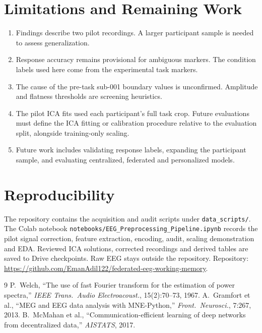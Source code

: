 \documentclass[11pt,a4paper]{article}
\begin{document}
\section{Limitations and Remaining Work}
\begin{enumerate}[leftmargin=*]
  \item Findings describe two pilot recordings. A larger participant sample
  is needed to assess generalization.
  \item Response accuracy remains provisional for ambiguous markers. The
  condition labels used here come from the experimental task markers.
  \item The cause of the pre-task sub-001 boundary values is unconfirmed.
  Amplitude and flatness thresholds are screening heuristics.
  \item The pilot ICA fits used each participant's full task crop. Future
  evaluations must define the ICA fitting or calibration procedure relative
  to the evaluation split, alongside training-only scaling.
  \item Future work includes validating response labels, expanding the
  participant sample, and evaluating centralized, federated and personalized
  models.
\end{enumerate}

\section{Reproducibility}
The repository contains the acquisition and audit scripts under
\texttt{data\_scripts/}. The Colab notebook
\texttt{notebooks/EEG\_Preprocessing\_Pipeline.ipynb} records the pilot signal
correction, feature extraction, encoding, audit, scaling demonstration and
EDA. Reviewed ICA solutions, corrected recordings and derived tables are
saved to Drive checkpoints. Raw EEG stays outside the repository.
Repository: \url{https://github.com/EmanAdil122/federated-eeg-working-memory}.

\begin{thebibliography}{9}
 P.~Welch, ``The use of fast Fourier transform for the estimation of power spectra,'' \emph{IEEE Trans.\ Audio Electroacoust.}, 15(2):70--73, 1967.
 A.~Gramfort et al., ``MEG and EEG data analysis with MNE-Python,'' \emph{Front.\ Neurosci.}, 7:267, 2013.
 B.~McMahan et al., ``Communication-efficient learning of deep networks from decentralized data,'' \emph{AISTATS}, 2017.
\end{thebibliography}
\end{document}

